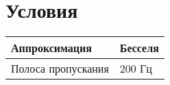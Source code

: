 \chapter{Условия}

    \begin{table}[ht]
	\begin{tabular}{|l|l|}
		\hline
Аппроксимация & Бесселя
 \\ \hline
Полоса пропускания & 200 Гц \\ \hline
		
	\end{tabular}
\end{table}
